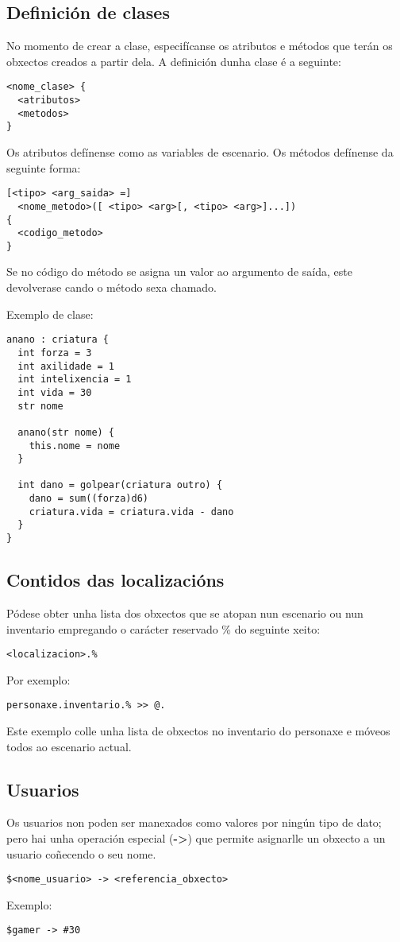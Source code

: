 \subsection{Definición de clases}
No momento de crear a clase, especifícanse os atributos e métodos que terán os
obxectos creados a partir dela. A definición dunha clase é a seguinte:
\begin{lstlisting}
<nome_clase> {
  <atributos>
  <metodos>
}
\end{lstlisting}
\par Os atributos defínense como as variables de escenario. Os métodos defínense
da seguinte forma:
\begin{lstlisting}
[<tipo> <arg_saida> =]
  <nome_metodo>([ <tipo> <arg>[, <tipo> <arg>]...])
{
  <codigo_metodo>
}
\end{lstlisting}
\par Se no código do método se asigna un valor ao argumento de saída, este
devolverase cando o método sexa chamado.
\par Exemplo de clase:
\begin{lstlisting}
anano : criatura {
  int forza = 3
  int axilidade = 1
  int intelixencia = 1
  int vida = 30
  str nome
  
  anano(str nome) {
    this.nome = nome
  }
  
  int dano = golpear(criatura outro) {
    dano = sum((forza)d6)
    criatura.vida = criatura.vida - dano
  }
}
\end{lstlisting}

\subsection{Contidos das localizacións}
Pódese obter unha lista dos obxectos que se atopan nun escenario ou nun
inventario empregando o carácter reservado \% do seguinte xeito:
\begin{lstlisting}
<localizacion>.%
\end{lstlisting}
\par Por exemplo:
\begin{lstlisting}
personaxe.inventario.% >> @.
\end{lstlisting}
\par Este exemplo colle unha lista de obxectos no inventario do personaxe e
móveos todos ao escenario actual.

\subsection{Usuarios}
Os usuarios non poden ser manexados como valores por ningún tipo de dato; pero
hai unha operación especial ({\bf -\textgreater}) que permite asignarlle un
obxecto a un usuario coñecendo o seu nome.
\begin{lstlisting}
$<nome_usuario> -> <referencia_obxecto>
\end{lstlisting}
\par Exemplo:
\begin{lstlisting}
$gamer -> #30
\end{lstlisting}